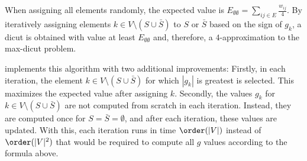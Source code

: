 When assigning all elements randomly, the expected value is $E_{\emptyset\emptyset} = \sum_{ij \in E} \frac{w_{ij}}{4}$.
By iteratively assigning elements $k \in V \setminus (S \cup \bar{S})$ to $S$ or $\bar{S}$ based on the sign of $g_k$, a dicut is obtained with value at least $E_{\emptyset\emptyset}$ and, therefore, a $4$-approximation to the max-dicut problem.

 implements this algorithm with two additional improvements:
Firstly, in each iteration, the element $k \in V \setminus (S \cup \bar{S})$ for which $|g_k|$ is greatest is selected.
This maximizes the expected value after assigning $k$.
Secondly, the values $g_k$ for $k \in V \setminus (S \cup \bar{S})$ are not computed from scratch in each iteration.
Instead, they are computed once for $S=\bar{S}=\emptyset$, and after each iteration, these values are updated.
With this, each iteration runs in time $\order(|V|)$ instead of $\order(|V|^2)$ that would be required to compute all $g$ values according to the formula above.

